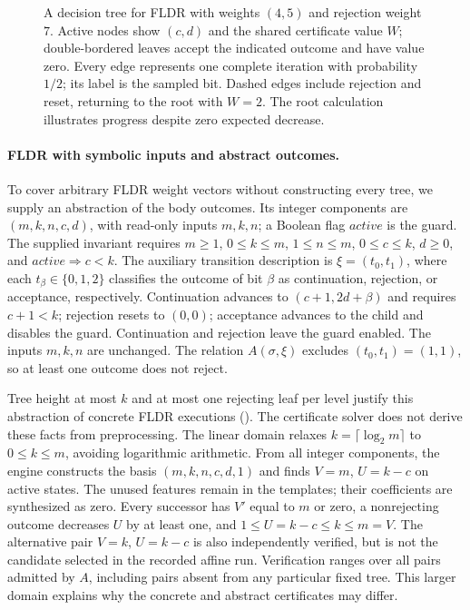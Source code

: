 \begin{figure}[tbp]
 \caption{A decision tree for FLDR with weights $(4,5)$ and rejection
 weight $7$. Active nodes show $(c,d)$ and the shared certificate value
 $W$; double-bordered leaves accept the indicated outcome and have value
 zero. Every edge represents one complete iteration with probability
 $1/2$; its label is the sampled bit. Dashed edges include rejection and
 reset, returning to the root with $W=2$. The root calculation illustrates
 progress despite zero expected decrease.}
 \label{fig:fldr-synthesis-tree}
\end{figure}

\paragraph{FLDR with symbolic inputs and abstract outcomes.}
To cover arbitrary FLDR weight vectors without constructing every tree,
we supply an abstraction of the body outcomes. Its integer components
are $(m,k,n,c,d)$, with read-only inputs $m,k,n$; a Boolean flag
$\mathit{active}$ is the guard. The supplied invariant requires
$m\geq1$, $0\leq k\leq m$, $1\leq n\leq m$, $0\leq c\leq k$,
$d\geq0$, and $\mathit{active}\Rightarrow c<k$.
The auxiliary transition description is $\xi=(t_0,t_1)$, where each
$t_\beta\in\{0,1,2\}$ classifies the outcome of bit $\beta$ as
continuation, rejection, or acceptance, respectively.
Continuation advances to $(c+1,2d+\beta)$ and requires $c+1<k$;
rejection resets to $(0,0)$; acceptance advances to the child and
disables the guard. Continuation and rejection leave the guard enabled.
The inputs $m,k,n$ are unchanged. The relation $A(\sigma,\xi)$ excludes
$(t_0,t_1)=(1,1)$, so at least one outcome does not reject.

Tree height at most $k$ and at most one rejecting leaf per level justify
this abstraction of concrete FLDR executions ().
The certificate solver does not derive these facts from preprocessing.
The linear domain relaxes $k=\lceil\log_2m\rceil$ to $0\leq k\leq m$,
avoiding logarithmic arithmetic. From all integer components, the engine
constructs the basis $(m,k,n,c,d,1)$ and finds $V=m$, $U=k-c$ on active
states. The unused features remain in the templates; their coefficients are
synthesized as zero.
Every successor has $V'$ equal to $m$ or zero, a nonrejecting outcome
decreases $U$ by at least one, and $1\leq U=k-c\leq k\leq m=V$.
The alternative pair $V=k$, $U=k-c$ is also independently verified,
but is not the candidate selected in the recorded affine run.
Verification ranges over all pairs admitted by $A$, including pairs
absent from any particular fixed tree. This larger domain explains why
the concrete and abstract certificates may differ.

